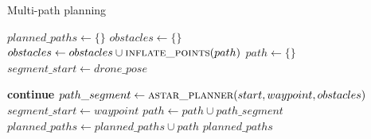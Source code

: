   \begin{algorithm}[!h]
  \caption{Multi-path planning}\label{alg:cap}
  \begin{algorithmic}

    \State $planned\_paths \gets \{\}$
     
      \State $obstacles \gets \{\}$
        \State $obstacles \gets obstacles \cup \Call{inflate\_points}{path}$ %
      \EndFor
      \State $path \gets \{\}$
      \State $segment\_start \gets drone\_pose$

          \State \textbf{continue}
        \EndIf
        \State $path\_segment \gets \Call{astar\_planner}{start, waypoint, obstacles}$
        \State $segment\_start \gets waypoint$
        \State $path \gets path \cup path\_segment$
      \EndFor
      \State $planned\_paths \gets planned\_paths \cup path$
    \EndFor
    \State \Return $planned\_paths$
  \EndFunction


  \end{algorithmic}
    \label{alg:planning}
  \end{algorithm}%





